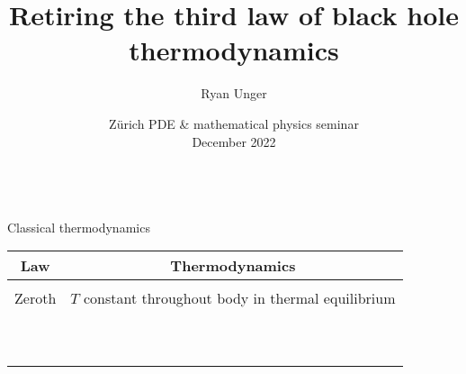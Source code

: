 \documentclass[compress,usenames,dvipsnames,8pt]{beamer}
\theoremstyle{definition}
\renewcommand{\(}{\begin{columns}}
\renewcommand{\)}{\end{columns}}
\newcommand{\<}[1]{\begin{column}{#1}}
\renewcommand{\>}{\end{column}}
\begin{document}


\begin{frame}
\title{Retiring the third law of black hole thermodynamics}
\author{Ryan Unger}
\date{
\small{ Z\"urich PDE \& mathematical physics  seminar }\\
December 2022 \\~\\
}
\titlepage
\end{frame}


\begin{frame}{Classical thermodynamics}


\pause

\begin{center}
\begin{tabular}{|cc|}
\hline
Law & Thermodynamics \\
\hline \hline 
& \\
Zeroth & $T$ constant throughout body in thermal equilibrium\\ 
& \\ 
 \hline 
& \\
 &   \\
& \\
\hline 
& \\
&  \\
& \\
\hline
& \\
 &  \\
& \\
\hline
\end{tabular}
\end{center}



\end{frame}
\end{document}
